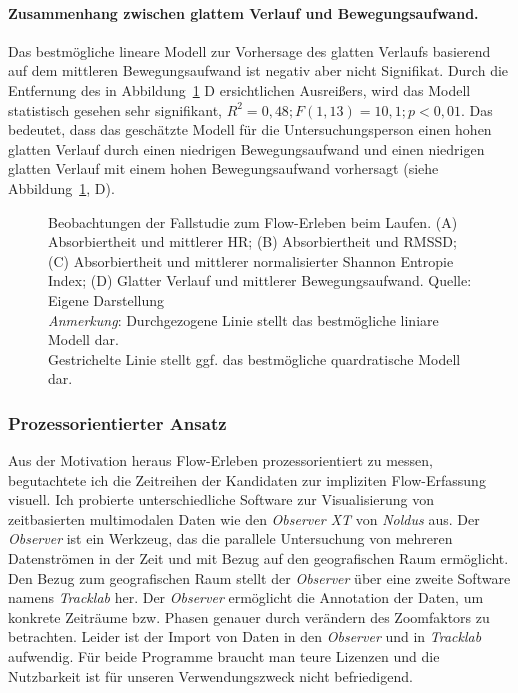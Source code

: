 \paragraph{Zusammenhang zwischen glattem Verlauf und Bewegungsaufwand.}
\label{par:zusammenhang_zwischen_glattem_verlauf_und_bewegungsaufwand}
Das bestmögliche lineare Modell zur Vorhersage des glatten Verlaufs basierend auf dem mittleren Bewegungsaufwand ist negativ aber nicht Signifikat. Durch die Entfernung des in Abbildung~\ref{fig:5_8_regression} D ersichtlichen Ausreißers, wird das Modell statistisch gesehen sehr signifikant, $R^2 = 0{,}48; F(1, 13) = 10{,}1; p < 0{,}01$. Das bedeutet, dass das geschätzte Modell für die Untersuchungsperson einen hohen glatten Verlauf durch einen niedrigen Bewegungsaufwand und einen niedrigen glatten Verlauf mit einem hohen Bewegungsaufwand vorhersagt (siehe Abbildung~\ref{fig:5_8_regression}, D).

\begin{figure}
	
	\caption[Beobachtungen der Fallstudie zum Flow-Erleben beim Laufen]{Beobachtungen der Fallstudie zum Flow-Erleben beim Laufen. (A) Absorbiertheit und mittlerer HR; (B) Absorbiertheit und RMSSD; (C) Absorbiertheit und mittlerer normalisierter Shannon Entropie Index; (D) Glatter Verlauf und mittlerer Bewegungsaufwand. Quelle: Eigene Darstellung \\ \hspace{\textwidth}\emph{Anmerkung}: Durchgezogene Linie stellt das bestmögliche liniare Modell dar. \\ \hspace{\textwidth}Gestrichelte Linie stellt ggf. das bestmögliche quardratische Modell dar.}
	\label{fig:5_8_regression}
\end{figure}

\subsubsection{Prozessorientierter Ansatz}
\label{subs:prozessorientierter_ansatz_1}
Aus der Motivation heraus Flow-Erleben prozessorientiert zu messen, begutachtete ich die Zeitreihen der Kandidaten zur impliziten Flow-Erfassung visuell. Ich probierte unterschiedliche Software zur Visualisierung von zeitbasierten multimodalen Daten wie den \emph{Observer XT} von \emph{Noldus} aus. Der \emph{Observer} ist ein Werkzeug, das die parallele Untersuchung von mehreren Datenströmen in der Zeit und mit Bezug auf den geografischen Raum ermöglicht. Den Bezug zum geografischen Raum stellt der \emph{Observer} über eine zweite Software namens \emph{Tracklab} her. Der \emph{Observer} ermöglicht die Annotation der Daten, um konkrete Zeiträume bzw. Phasen genauer durch verändern des Zoomfaktors zu betrachten. Leider ist der Import von Daten in den \emph{Observer} und in \emph{Tracklab} aufwendig. Für beide Programme braucht man teure Lizenzen und die Nutzbarkeit ist für unseren Verwendungszweck nicht befriedigend.

